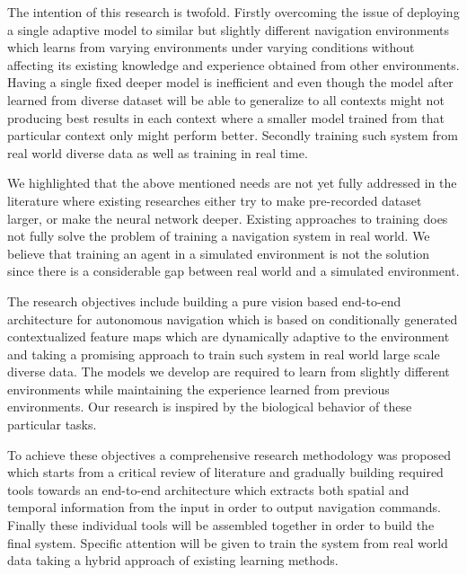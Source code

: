 The intention of this research is twofold. Firstly overcoming the issue of deploying a single adaptive model to similar but slightly different navigation environments which learns from varying environments under varying conditions without affecting its existing knowledge and experience obtained from other environments. Having a single fixed deeper model is inefficient and even though the model after learned from diverse dataset will be able to generalize to all contexts might not producing best results in each context where a smaller model trained from that particular context only might perform better. Secondly training such system from real world diverse data as well as training in real time. 

We highlighted that the above mentioned needs are not yet fully addressed in the literature where existing researches either try to make pre-recorded dataset larger, or make the neural network deeper. Existing approaches to training does not fully solve the problem of training a navigation system in real world. We believe that training an agent in a simulated environment is not the solution since there is a considerable gap between real world and a simulated environment.

The research objectives include building a pure vision based end-to-end architecture for autonomous navigation which is based on conditionally generated contextualized feature maps which are dynamically adaptive to the environment and taking a promising approach to train such system in real world large scale diverse data. The models we develop are required to learn from slightly different environments while maintaining the experience learned from previous environments. Our research is inspired by the biological behavior of these particular tasks. 

To achieve these objectives a comprehensive research methodology was proposed which starts from a critical review of literature and gradually building required tools towards an end-to-end architecture which extracts both spatial and temporal information from the input in order to output navigation commands. Finally these individual tools will be assembled together in order to build the final system. Specific attention will be given to train the system from real world data taking a hybrid approach of existing learning methods. 